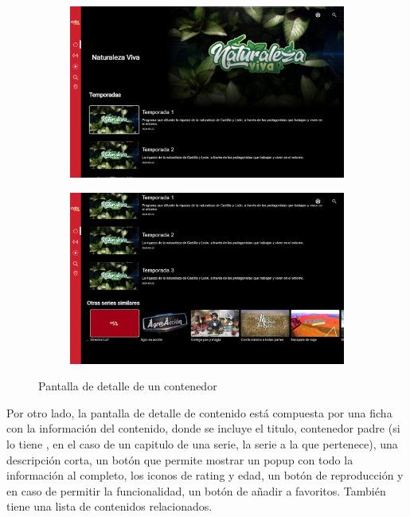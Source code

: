 \begin{figure}[H]
    \begin{subfigure}[c]{0.5\textwidth}
        \includegraphics[width=\textwidth]{imaxes/OTT/pantalla_detalle_contenedor1.png}
        \label{fig:Widget_banner_contenedor}
    \end{subfigure}
    \hspace{0.1\textwidth}
    \begin{subfigure}[c]{0.5\textwidth}
        \includegraphics[width=\textwidth]{imaxes/OTT/pantalla_detalle_contenedor2.png}
        \label{fig:Widget_mosaico}
    \end{subfigure}
    \caption{Pantalla de detalle de un contenedor}
\end{figure}

Por otro lado, la pantalla de detalle de contenido está compuesta por una ficha con la información del contenido, donde se incluye el titulo, contenedor padre (si lo
tiene , en el caso de un capitulo de una serie, la serie a la que pertenece), una descripción corta, un botón que permite mostrar un popup con todo la información al 
completo, los iconos de rating y edad, un botón de reproducción y en caso de permitir la funcionalidad, un botón de añadir a favoritos. También tiene una lista de
contenidos relacionados.

